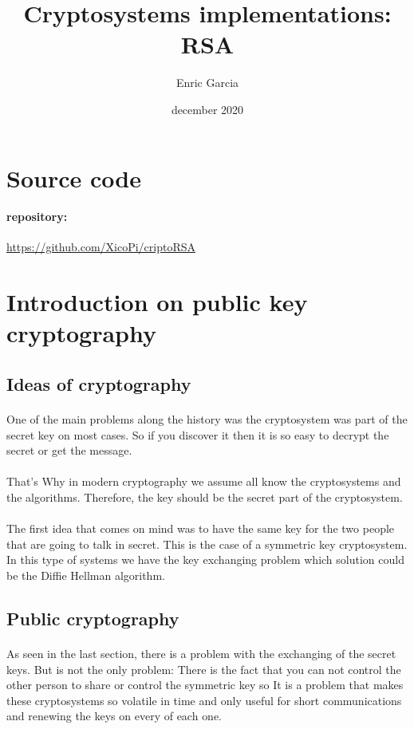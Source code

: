 \documentclass{article}
\title{Cryptosystems implementations: RSA}
\author{Enric Garcia}
\date{december 2020}
\begin{document}
\maketitle
\section{Source code}
\paragraph{repository:}
\url{https://github.com/XicoPi/criptoRSA}

\section{Introduction on public key cryptography}
\subsection{Ideas of cryptography}
\paragraph{}
One of the main problems along the history was the cryptosystem was part of the secret key on most cases. So if you discover it then it is so easy to decrypt the secret or get the message.
\paragraph{}
That's Why in modern cryptography we assume all know the cryptosystems and the algorithms. Therefore, the key should be the secret part of the cryptosystem. 
\paragraph{}
The first idea that comes on mind was to have the same key for the two people that are going to talk in secret. This is the case of a symmetric key cryptosystem. In this type of systems we have the key exchanging problem which solution could be the Diffie Hellman algorithm.
\subsection{Public cryptography}
\paragraph{}
As seen in the last section, there is a problem with the exchanging of the secret keys. But is not the only problem: There is the fact that you can not control the other person to share or control the symmetric key so It is a problem that makes these cryptosystems so volatile in time and only useful for short communications and renewing the keys on every of each one.
\end{document}
